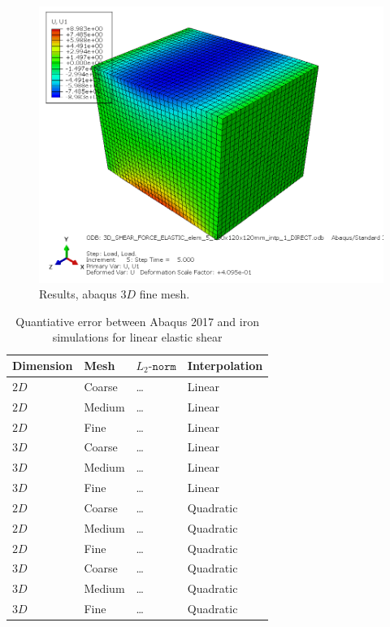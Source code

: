 \begin{figure}[h!]
    \centering 
    \includegraphics[width=\columnwidth]{examples/example-0112/doc/figures/3D_SHEAR_FORCE_ELASTIC_elem_5_160x120x120mm_intp_1_DIRECTU1.png} 
    \caption{Results, abaqus $3D$ fine mesh.}
    \label{example-0112-abaqus-3D-fig}
\end{figure}
%
\begin{table}
	\centering
    \begin{tabular}{llll}
    Dimension & Mesh 		& $L_2\texttt{-norm}$			& Interpolation \\ \hline
    $2D$      & Coarse 	& \ldots									& Linear \\
    $2D$      & Medium  & \ldots									& Linear \\
    $2D$      & Fine  	& \ldots									& Linear \\
    $3D$      & Coarse  & \ldots									& Linear \\
    $3D$      & Medium  & \ldots									& Linear \\
		$3D$			&	Fine 		&	\ldots									& Linear \\
    $2D$      & Coarse 	& \ldots									& Quadratic \\
    $2D$      & Medium  & \ldots									& Quadratic \\
    $2D$      & Fine  	& \ldots									& Quadratic \\
    $3D$      & Coarse  & \ldots									& Quadratic \\
    $3D$      & Medium  & \ldots									& Quadratic \\
		$3D$			&	Fine 		&	\ldots									& Quadratic \\				
    \end{tabular}
		\caption{Quantiative error between Abaqus 2017 and iron simulations for linear elastic shear}
		\label{tab:example-0112-valid-Iron-Abaqus}
\end{table}

